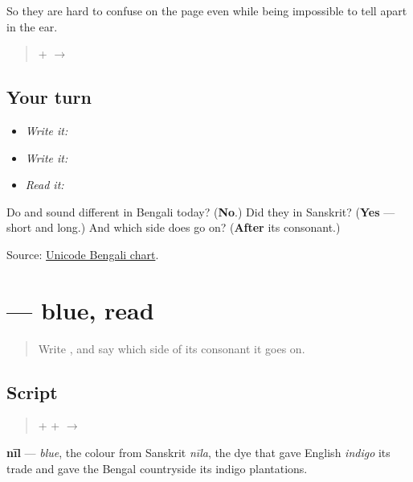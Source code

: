 So they are hard to confuse on the page even while being impossible to tell apart in the ear.

\begin{quote}
\textbf{} + \textbf{} $\to$ \textbf{}
\end{quote}

\subsection*{Your turn}
\begin{itemize}
\raggedright
  \item \emph{Write it:} 
  \item \emph{Write it:} 
  \item \emph{Read it:} 
\end{itemize}

\begin{tcolorbox}[breakable,colback=teal!4,colframe=teal!35!black,title={Before you move on}]
Do \textbf{} and \textbf{} sound different in Bengali today? (\textbf{No}.) Did they in Sanskrit? (\textbf{Yes} — short and long.) And which side does \textbf{} go on? (\textbf{After} its consonant.)

Source: \href{https://www.unicode.org/charts/PDF/U0980.pdf}{Unicode Bengali chart}.
\end{tcolorbox}
\section[\texorpdfstring{\bn{নীল} (nīl)}{নীল (nīl)}]{ — blue, read}

\label{lesson:BN-W04-nil-read}



\begin{quote}
Write \textbf{}, and say which side of its consonant it goes on.
\end{quote}

\subsection*{Script}
\begin{quote}
\textbf{} + \textbf{} + \textbf{} $\to$ \textbf{}
\end{quote}

\textbf{nīl} — \emph{blue}, the colour from Sanskrit \emph{nīla}, the dye that gave English \emph{indigo} its trade and gave the Bengal countryside its indigo plantations.

